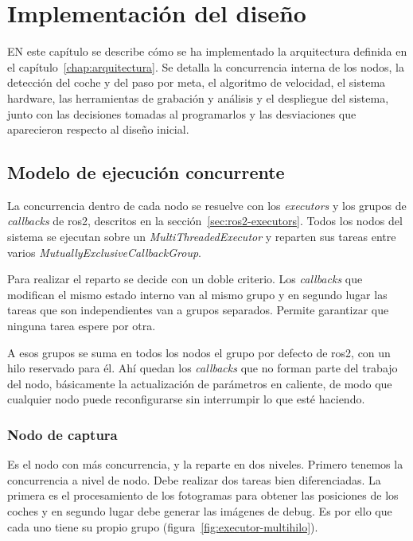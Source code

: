 \chapter{Implementación del diseño}
\label{chap:implementacion}

\lettrine{E}{N} este capítulo se describe cómo se ha implementado la arquitectura definida en el capítulo~\ref{chap:arquitectura}. Se detalla la concurrencia interna de los nodos, la detección del coche y del paso por meta, el algoritmo de velocidad, el sistema hardware, las herramientas de grabación y análisis y el despliegue del sistema, junto con las decisiones tomadas al programarlos y las desviaciones que aparecieron respecto al diseño inicial.

\section{Modelo de ejecución concurrente}
\label{concurrencia}

La concurrencia dentro de cada nodo se resuelve con los \emph{executors} y los grupos de \emph{callbacks} de \gls{ros2}, descritos en la sección~\ref{sec:ros2-executors}. Todos los nodos del sistema se ejecutan sobre un \emph{MultiThreadedExecutor} y reparten sus tareas entre varios \emph{MutuallyExclusiveCallbackGroup}.

Para realizar el reparto se decide con un doble criterio. Los \emph{callbacks} que modifican el mismo estado interno van al mismo grupo y en segundo lugar las tareas que son independientes van a grupos separados. Permite garantizar que ninguna tarea espere por otra.

A esos grupos se suma en todos los nodos el grupo por defecto de \gls{ros2}, con un hilo reservado para él. Ahí quedan los \emph{callbacks} que no forman parte del trabajo del nodo, básicamente la actualización de parámetros en caliente, de modo que cualquier nodo puede reconfigurarse sin interrumpir lo que esté haciendo.

\subsection{Nodo de captura}
\label{subsec:concurrencia-camara}

Es el nodo con más concurrencia, y la reparte en dos niveles. 
Primero tenemos la concurrencia a nivel de nodo. Debe realizar dos tareas bien diferenciadas. La primera es el procesamiento de los fotogramas para obtener las posiciones de los coches y en segundo lugar debe generar las imágenes de debug. Es por ello que cada uno tiene su propio grupo (figura~\ref{fig:executor-multihilo}).

